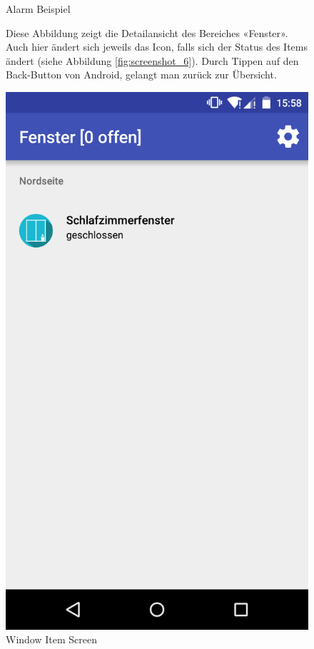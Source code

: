 \begin{figure}[htbp]
\begin{minipage}{0.32\textwidth}
		\caption{Alarm Beispiel}
		\label{fig:screenshot_7}
	\end{minipage}
\end{figure}


\begin{figure}[htbp]
	\begin{minipage}{0.6\textwidth} 
Diese Abbildung zeigt die Detailansicht des Bereiches «Fenster». Auch hier ändert sich jeweils das Icon, falls sich der Status des Items ändert (siehe Abbildung \ref{fig:screenshot_6}). Durch Tippen auf den Back-Button von Android, gelangt man zurück zur Übersicht.
	\end{minipage}
	\hfill
	\begin{minipage}{0.32\textwidth}
		\includegraphics[scale=0.12]{appendix/img/AppScreenshots/Screenshot3}
		\caption{Window Item Screen}
		\label{fig:screenshot_3}
	\end{minipage}
\end{figure}

